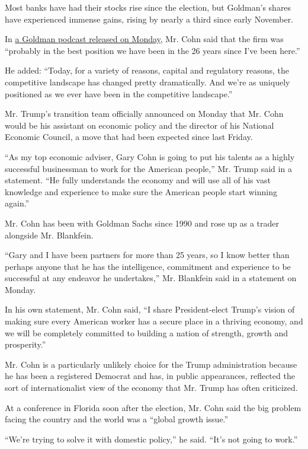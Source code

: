 Most banks have had their stocks rise since the election, but Goldman's
shares have experienced immense gains, rising by nearly a third since
early November.

In
\href{http://www.goldmansachs.com/our-thinking/podcasts/episodes/12-12-2016-gary-cohn.html}{a
Goldman podcast released on Monday}, Mr. Cohn said that the firm was
``probably in the best position we have been in the 26 years since I've
been here.''

He added: ``Today, for a variety of reasons, capital and regulatory
reasons, the competitive landscape has changed pretty dramatically. And
we're as uniquely positioned as we ever have been in the competitive
landscape.''

Mr. Trump's transition team officially announced on Monday that Mr. Cohn
would be his assistant on economic policy and the director of his
National Economic Council, a move that had been expected since last
Friday.

``As my top economic adviser, Gary Cohn is going to put his talents as a
highly successful businessman to work for the American people,'' Mr.
Trump said in a statement. ``He fully understands the economy and will
use all of his vast knowledge and experience to make sure the American
people start winning again.''

Mr. Cohn has been with Goldman Sachs since 1990 and rose up as a trader
alongside Mr. Blankfein.

``Gary and I have been partners for more than 25 years, so I know better
than perhaps anyone that he has the intelligence, commitment and
experience to be successful at any endeavor he undertakes,'' Mr.
Blankfein said in a statement on Monday.

In his own statement, Mr. Cohn said, ``I share President-elect Trump's
vision of making sure every American worker has a secure place in a
thriving economy, and we will be completely committed to building a
nation of strength, growth and prosperity.''

Mr. Cohn is a particularly unlikely choice for the Trump administration
because he has been a registered Democrat and has, in public
appearances, reflected the sort of internationalist view of the economy
that Mr. Trump has often criticized.

At a conference in Florida soon after the election, Mr. Cohn said the
big problem facing the country and the world was a ``global growth
issue.''

``We're trying to solve it with domestic policy,'' he said. ``It's not
going to work.''

